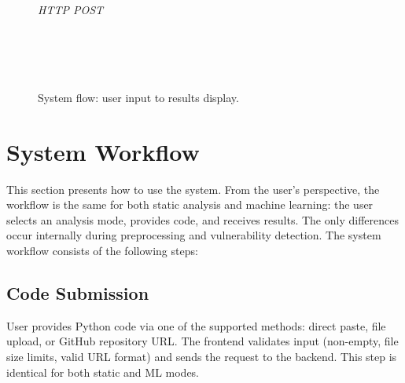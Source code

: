 \begin{figure}[htbp]
	\centering
	\small
	\setlength{\fboxsep}{4pt}
	\newcommand{\flowarrow}{\raisebox{0.5ex}{$\downarrow$}}
	 \\[0.8ex]
	\flowarrow \\[0.4ex]
	 \\[0.8ex]
	\flowarrow \\[0.4ex]
	 \\[0.4ex]
	\flowarrow \quad \textit{HTTP POST} \\[0.4ex]
	 \\[0.8ex]
	\flowarrow \\[0.4ex]
	 \\[0.8ex]
	\flowarrow \\[0.4ex]
	\caption{System flow: user input to results display.}
	\label{fig:system_flow}
\end{figure}

\section{System Workflow}
\label{sec:system_workflow}

This section presents how to use the system. From the user's perspective, the workflow is the same for both static analysis and machine learning: the user selects an analysis mode, provides code, and receives results. The only differences occur internally during preprocessing and vulnerability detection. The system workflow consists of the following steps:

\subsection{Code Submission}
\label{sec:workflow_submission}

User provides Python code via one of the supported methods: direct paste, file upload, or GitHub repository URL. The frontend validates input (non-empty, file size limits, valid URL format) and sends the request to the backend. This step is identical for both static and ML modes.

